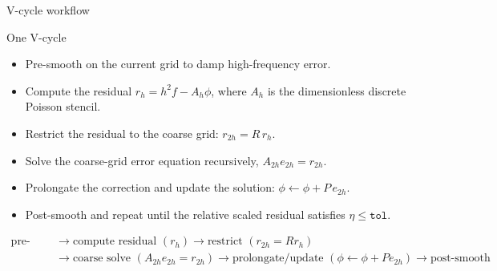 \documentclass[aspectratio=169]{beamer}
\newcommand{\frametitlesub}[2]{#2}
\begin{document}
\begin{frame}[t]{\frametitlesub{Transfer operators and cycles}{V-cycle workflow}}
    \footnotesize
    \begin{block}{One V-cycle}
        \begin{itemize}
            \item Pre-smooth on the current grid to damp high-frequency error.
            \item Compute the residual \(r_h = h^2 f - A_h \phi\), where \(A_h\) is the dimensionless discrete Poisson stencil.
            \item Restrict the residual to the coarse grid: \(r_{2h} = R\,r_h\).
            \item Solve the coarse-grid error equation recursively, \(A_{2h} e_{2h} = r_{2h}\).
            \item Prolongate the correction and update the solution: \(\phi \leftarrow \phi + P\,e_{2h}\).
            \item Post-smooth and repeat until the relative scaled residual satisfies \(\eta \le \texttt{tol}\).
        \end{itemize}
    \end{block}

    \[
        \begin{aligned}
            \text{pre-smooth} & \rightarrow \text{compute residual }(r_h) \rightarrow \text{restrict }(r_{2h}=Rr_h)                                                                         \\
                              & \rightarrow \text{coarse solve }(A_{2h}e_{2h}=r_{2h}) \rightarrow \text{prolongate/update }(\phi \leftarrow \phi + P e_{2h}) \rightarrow \text{post-smooth}
        \end{aligned}
    \]
\end{frame}
\end{document}

